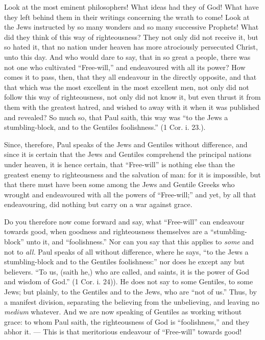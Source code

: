 Look at the most eminent philosophers! What ideas had they of God! What have they left behind them in their writings concerning the wrath to come! Look at the Jews instructed by so many wonders and so many successive Prophets! What did they think of this way of righteousness? They not only did not receive it, but so hated it, that no nation under heaven has more atrociously persecuted Christ, unto this day. And who would dare to say, that in so great a people, there was not one who cultivated “Free-will,” and endeavoured with all its power? How comes it to pass, then, that they all endeavour in the directly opposite, and that that which was the most excellent in the most excellent men, not only did not follow this way of righteousness, not only did not know it, but even thrust it from them with the greatest hatred, and wished to away with it when it was published and revealed? So much so, that Paul saith, this way was “to the Jews a stumbling-block, and to the Gentiles foolishness.” (1 Cor. i. 23.).

Since, therefore, Paul speaks of the Jews and Gentiles without difference, and since it is certain that the Jews and Gentiles comprehend the principal nations under heaven, it is hence certain, that “Free-will” is nothing else than the greatest enemy to righteousness and the salvation of man: for it is impossible, but that there must have been some among the Jews and Gentile Greeks who wrought and endeavoured with all the powers of “Free-will;” and yet, by all that endeavouring, did nothing but carry on a war against grace.

Do you therefore now come forward and say, what “Free-will” can endeavour towards good, when goodness and righteousness themselves are a “stumbling-block” unto it, and “foolishness.” Nor can you say that this applies to \emph{some }and not to \emph{all. }Paul speaks of all without difference, where he says, “to the Jews a stumbling-block and to the Gentiles foolishness:” nor does he except any but believers. “To us, (saith he,) who are called, and saints, it is the power of God and wisdom of God.” (1 Cor. i. 24)). He does not say to some Gentiles, to some Jews; but plainly, to the Gentiles and to the Jews, who are “not of us.” Thus, by a manifest division, separating the believing from the unbelieving, and leaving no \emph{medium }whatever. And we are now speaking of Gentiles as working without grace: to whom Paul saith, the righteousness of God is “foolishness,” and they abhor it. — This is that meritorious endeavour of “Free-will” towards good!

